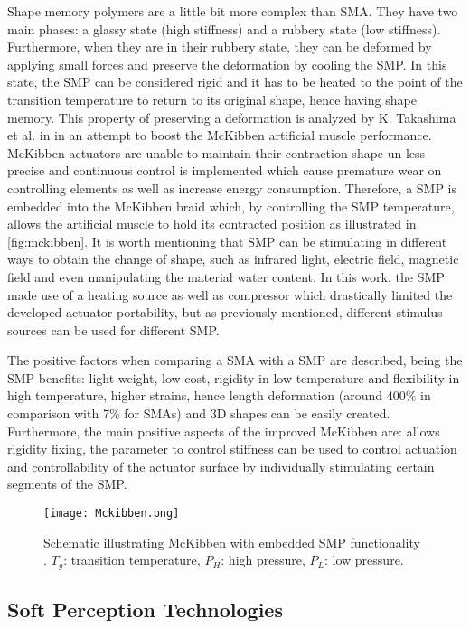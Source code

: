 Shape memory polymers are a little bit more complex than SMA. They have two main phases: a glassy state (high stiffness) and a rubbery state (low stiffness). Furthermore, when they are in their rubbery state, they can be deformed by applying small forces and preserve the deformation by cooling the SMP. In this state, the SMP can be considered rigid and it has to be heated to the point of the transition temperature to return to its original shape, hence having shape memory. This property of preserving a deformation is analyzed by K. Takashima et al. in \cite{Takashima2010} in an attempt to boost the McKibben artificial muscle performance. McKibben actuators are unable to maintain their contraction shape un-less precise and continuous control is implemented which cause premature wear on controlling elements as well as increase energy consumption. Therefore, a SMP is embedded into the McKibben braid which, by controlling the SMP temperature, allows the artificial muscle to hold its contracted position as illustrated in \autoref{fig:mckibben}. It is worth mentioning that SMP can be stimulating in different ways to obtain the change of shape, such as infrared light, electric field, magnetic field and even manipulating the material water content. In this work, the SMP made use of a heating source as well as compressor which drastically limited the developed actuator portability, but as previously mentioned, different stimulus sources can be used for different SMP.

The positive factors when comparing a SMA with a SMP are described, being the SMP benefits: light weight, low cost, rigidity in low temperature and flexibility in high temperature, higher strains, hence length deformation (around 400\% in comparison with 7\% for SMAs) and 3D shapes can be easily created. Furthermore, the main positive aspects of the improved McKibben are: allows rigidity fixing, the parameter to control stiffness can be used to control actuation and controllability of the actuator surface by individually stimulating certain segments of the SMP.

\begin{figure}[hbtp!]
    \centering
    \texttt{[image: Mckibben.png]}
    \caption{Schematic illustrating McKibben with embedded SMP functionality \cite{Takashima2010}. $T_g$: transition temperature, $P_H$: high pressure, $P_L$: low pressure. }
    \label{fig:mckibben}
\end{figure}

\subsection{Soft Perception Technologies}
